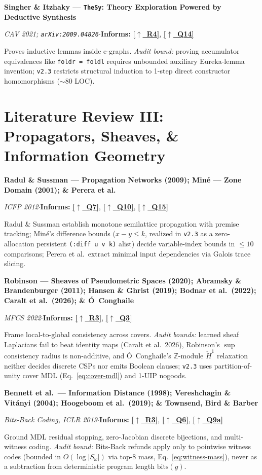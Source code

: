 \documentclass[12pt]{article}
\newcommand{\secback}[2]{\hyperref[#1]{\textcolor{linkblue}{\textbf{\small[\(\uparrow\)~#2]}}}}
\newcommand{\litentry}[4]{%
  \par\medskip\noindent\hypertarget{lit:#1}{}%
  \textbf{#2}\par\nopagebreak\noindent
  {\footnotesize\textit{#3}\quad$\cdot$\quad\textbf{Informs:} #4}\par\nopagebreak\smallskip\noindent\ignorespaces
}
\begin{document}
\litentry{singher2021}{Singher \& Itzhaky --- \texttt{TheSy}: Theory Exploration Powered by Deductive Synthesis}{CAV 2021; \texttt{arXiv:2009.04826}}{\secback{sec:thesis}{R4}, \secback{ans:14}{Q14}}
Proves inductive lemmas inside e-graphs. \emph{Audit bound:} proving accumulator equivalences like \texttt{foldr = foldl} requires unbounded auxiliary Eureka-lemma invention; \texttt{v2.3} restricts structural induction to 1-step direct constructor homomorphisms ($\sim 80$ LOC).

\section{Literature Review III: Propagators, Sheaves, \& Information Geometry}
\label{sec:app-c}

\litentry{radul2009}{Radul \& Sussman --- Propagation Networks (2009); \hypertarget{lit:mine2001}{}Min\'e --- Zone Domain (2001); \& \hypertarget{lit:perera2012}{}Perera et al.}{ICFP 2012}{\secback{ans:7}{Q7}, \secback{ans:10}{Q10}, \secback{ans:15}{Q15}}
Radul \& Sussman establish monotone semilattice propagation with premise tracking; Min\'e's difference bounds ($x - y \le k$, realized in \texttt{v2.3} as a zero-allocation persistent \texttt{(:diff u v k)} alist) decide variable-index bounds in $\le 10$ comparisons; Perera et al.\ extract minimal input dependencies via Galois trace slicing.

\litentry{robinson2020}{Robinson --- Sheaves of Pseudometric Spaces (2020); \hypertarget{lit:abramsky2011}{}Abramsky \& Brandenburger (2011); \hypertarget{lit:hansen2019}{}Hansen \& Ghrist (2019); \hypertarget{lit:bodnar2022}{}Bodnar et al.\ (2022); \hypertarget{lit:caralt2026}{}Caralt et al.\ (2026); \& \hypertarget{lit:oconghaile2022}{}\'O~Conghaile}{MFCS 2022}{\secback{sec:thesis}{R3}, \secback{ans:3}{Q3}}
Frame local-to-global consistency across covers. \emph{Audit bounds:} learned sheaf Laplacians fail to beat identity maps (Caralt et al.\ 2026), Robinson's $\sup$ consistency radius is non-additive, and \'O~Conghaile's $\mathbb{Z}$-module $\check{H}^1$ relaxation neither decides discrete CSPs nor emits Boolean clauses; \texttt{v2.3} uses partition-of-unity cover MDL (Eq.~\ref{eq:cover-mdl}) and 1-UIP nogoods.

\litentry{bennett1998}{Bennett et al.\ --- Information Distance (1998); \hypertarget{lit:vereshchagin2004}{}Vereshchagin \& Vit\'anyi (2004); \hypertarget{lit:hoogeboom2019}{}Hoogeboom et al.\ (2019); \& \hypertarget{lit:townsend2019}{}Townsend, Bird \& Barber}{Bits-Back Coding, ICLR 2019}{\secback{sec:thesis}{R3}, \secback{ans:6}{Q6}, \secback{ans:9a}{Q9a}}
Ground MDL residual stopping, zero-Jacobian discrete bijections, and multi-witness coding. \emph{Audit bound:} Bits-Back refunds apply only to pointwise witness codes (bounded in $O(\log|S_\omega|)$ via top-8 mass, Eq.~\ref{eq:witness-mass}), never as a subtraction from deterministic program length $\mathrm{bits}(g)$.
\end{document}
